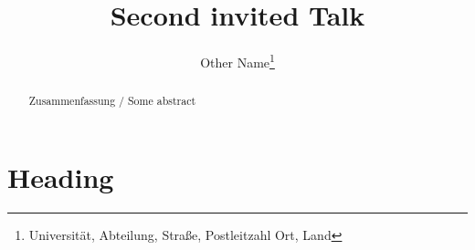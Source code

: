 \documentclass[english]{lni}
\begin{document}
\title{Second invited Talk}
\author[Other Name]
{Other Name\footnote{Universität, Abteilung, Straße, Postleitzahl Ort,
Land }}
\maketitle

\begin{abstract}
Zusammenfassung / Some abstract
\end{abstract}
\section{Heading}
\blindtext
\end{document}
